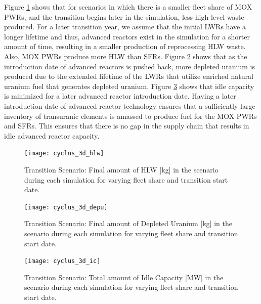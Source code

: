Figure \ref{fig:cyclus_3d_hlw} shows that for scenarios in which 
there is a smaller fleet share of \gls{MOX} \glspl{PWR}, and the 
transition begins later in the simulation, less high 
level waste produced. 
For a later transition year, we assume that the initial 
\glspl{LWR} have a longer lifetime
and thus, advanced reactors exist in the simulation for a shorter 
amount of time, resulting in a smaller production of reprocessing 
HLW waste. 
Also, \gls{MOX} \glspl{PWR} produce more \gls{HLW} than \glspl{SFR}. 
Figure \ref{fig:cyclus_3d_depu} shows that as the introduction date 
of advanced reactors is pushed back, more depleted uranium is produced 
due to the extended lifetime of the \glspl{LWR} that utilize enriched 
natural uranium fuel that generates depleted uranium. 
Figure \ref{fig:cyclus_3d_ic} shows that idle capacity is minimized 
for a later advanced reactor introduction date. 
Having a later introduction date of advanced reactor technology ensures 
that a sufficiently large inventory of transuranic elements is amassed
to produce fuel for the \gls{MOX} \glspl{PWR} and \glspl{SFR}.  
This ensures that there is no gap in the supply chain that results 
in idle advanced reactor capacity.

\begin{figure}[]
    \centering
    \texttt{[image: cyclus\_3d\_hlw]} 
    \caption{\Cyclus Transition Scenario: Final amount of HLW [kg] in the scenario during each simulation for varying fleet share and transition start date.}
    \label{fig:cyclus_3d_hlw}
\end{figure}

\begin{figure}[]
    \centering
    \texttt{[image: cyclus\_3d\_depu]} 
    \caption{\Cyclus Transition Scenario: Final amount of Depleted Uranium [kg] in the scenario during each simulation for varying fleet share and transition start date.}
    \label{fig:cyclus_3d_depu}
\end{figure}

\begin{figure}[]
    \centering
    \texttt{[image: cyclus\_3d\_ic]} 
    \caption{\Cyclus Transition Scenario: Total amount of Idle Capacity [MW] in the scenario during each simulation for varying fleet share and transition start date.}
    \label{fig:cyclus_3d_ic}
\end{figure}

